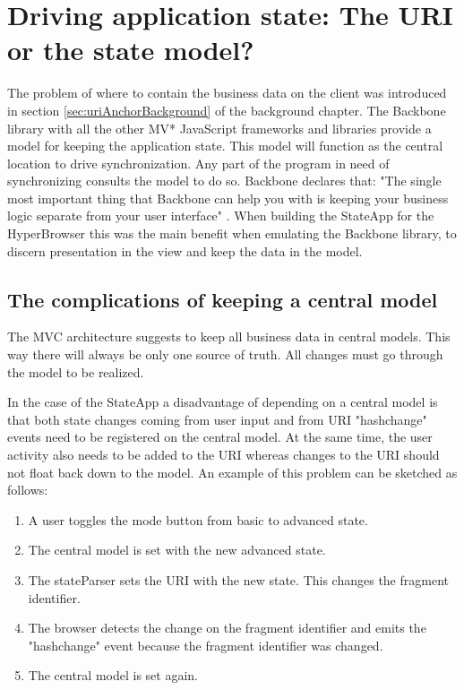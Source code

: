 \documentclass[english]{ifimaster}
\begin{document}
\section{Driving application state: The URI or the state model?}
\label{sec:drivingState}
The problem of where to contain the business data on the client was introduced in section \ref{sec:uriAnchorBackground} of the background chapter. The Backbone library with all the other MV* JavaScript frameworks and libraries provide a model for keeping the application state. This model will function as the central location to drive synchronization. Any part of the program in need of synchronizing consults the model to do so. Backbone declares that: "The single most important thing that Backbone can help you with is keeping your business logic separate from your user interface" \parencite{backbone}. When building the StateApp for the HyperBrowser this was the main benefit when emulating the Backbone library, to discern presentation in the view and keep the data in the model.
\subsection{The complications of keeping a central model} \label{sec:centralModel}  
The MVC architecture suggests to keep all business data in central models. This way there will always be only one source of truth. All changes must go through the model to be realized.

In the case of the StateApp a disadvantage of depending on a central model is that both state changes coming from user input and from URI "hashchange" events need to be registered on the central model. At the same time, the user activity also needs to be added to the URI whereas changes to the URI should not float back down to the model. An example of this problem can be sketched as follows:


\begin{enumerate}
\item A user toggles the mode button from basic to advanced state.
\item The central model is set with the new advanced state.
\item The stateParser sets the URI with the new state. This changes the fragment identifier.
\item The browser detects the change on the fragment identifier and emits the "hashchange" event because the fragment identifier was changed.
\item The central model is set again.
\end{enumerate} 
\end{document}
